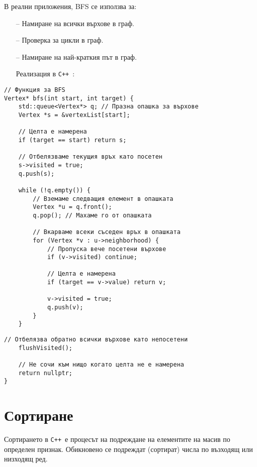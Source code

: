 \documentclass[oneside]{book}
\newcommand*{\cpp}{\texttt{C++}\ }
\begin{document}
В реални приложения, BFS се използва за:
\begin{itemize}
    \item[--] Намиране на всички върхове в граф.
    \item[--] Проверка за цикли в граф.
    \item[--] Намиране на най-краткия път в граф.
\end{itemize}

\begin{itemize}\item[Реализация] в \cpp:\end{itemize}\vspace{-6pt}
\begin{mdframed}\begin{lstlisting}[firstnumber=57]
// Функция за BFS
Vertex* bfs(int start, int target) {
    std::queue<Vertex*> q; // Празна опашка за върхове
    Vertex *s = &vertexList[start];

    // Целта е намерена
    if (target == start) return s;

    // Отбелязваме текущия връх като посетен
    s->visited = true;
    q.push(s);

    while (!q.empty()) {
        // Вземаме следващия елемент в опашката
        Vertex *u = q.front();
        q.pop(); // Махаме го от опашката

        // Вкарваме всеки съседен връх в опашката
        for (Vertex *v : u->neighborhood) {
            // Пропуска вече посетени върхове
            if (v->visited) continue;

            // Целта е намерена
            if (target == v->value) return v;

            v->visited = true;
            q.push(v);
        }
    }
\end{lstlisting}\end{mdframed}
\begin{mdframed}\begin{lstlisting}[firstnumber=last]
    // Отбелязва обратно всички върхове като непосетени
    flushVisited();

    // Не сочи към нищо когато целта не е намерена
    return nullptr;
}
\end{lstlisting}\end{mdframed}

\section{Сортиране}
Сортирането в \cpp е процесът на подреждане на елементите на масив по определен признак. Обикновено се подреждат (сортират) числа по възходящ или низходящ ред.
\end{document}
